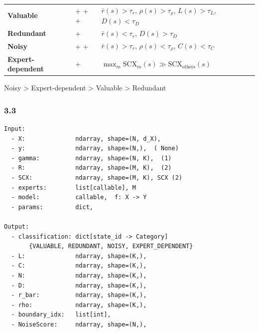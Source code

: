 \documentclass[
  12pt,
]{article}
\begin{document}
\begin{longtable}[]{@{}
  >{\raggedright\arraybackslash}p{}
  >{\raggedright\arraybackslash}p{}
  >{\raggedright\arraybackslash}p{}@{}}
\toprule\noalign{}
\begin{minipage}[b]{\linewidth}\raggedright

\end{minipage} & \begin{minipage}[b]{\linewidth}\raggedright

\end{minipage} & \begin{minipage}[b]{\linewidth}\raggedright

\end{minipage} \\
\midrule\noalign{}
\endhead
\bottomrule\noalign{}
\endlastfoot
\textbf{Valuable} &  +  +  +  &
\(\bar{r}(s) > \tau_r\), \(\rho(s) > \tau_\rho\), \(L(s) > \tau_L\),
\(D(s) < \tau_D\) \\
\textbf{Redundant} &  +  & \(\bar{r}(s) < \tau_r\),
\(D(s) > \tau_D\) \\
\textbf{Noisy} &  +  +  & \(\bar{r}(s) > \tau_r\),
\(\rho(s) < \tau_\rho\), \(C(s) < \tau_C\) \\
\textbf{Expert-dependent} &  +  &
\(\max_m \text{SCX}_m(s) \gg \text{SCX}_{\text{others}}(s)\) \\
\end{longtable}

Noisy \textgreater{} Expert-dependent
\textgreater{} Valuable \textgreater{} Redundant

\subsubsection{3.3
}\label{ux8f93ux5165ux8f93ux51faux89c4ux8303-2}

\begin{verbatim}
Input:
  - X:              ndarray, shape=(N, d_X), 
  - y:              ndarray, shape=(N,),  ( None)
  - gamma:          ndarray, shape=(N, K),  (1)
  - R:              ndarray, shape=(M, K),  (2)
  - SCX:            ndarray, shape=(M, K), SCX (2)
  - experts:        list[callable], M 
  - model:          callable,  f: X -> Y
  - params:         dict, 

Output:
  - classification: dict[state_id -> Category]
       {VALUABLE, REDUNDANT, NOISY, EXPERT_DEPENDENT}
  - L:              ndarray, shape=(K,), 
  - C:              ndarray, shape=(K,), 
  - N:              ndarray, shape=(K,), 
  - D:              ndarray, shape=(K,), 
  - r_bar:          ndarray, shape=(K,), 
  - rho:            ndarray, shape=(K,), 
  - boundary_idx:   list[int], 
  - NoiseScore:     ndarray, shape=(N,), 
\end{verbatim}
\end{document}
